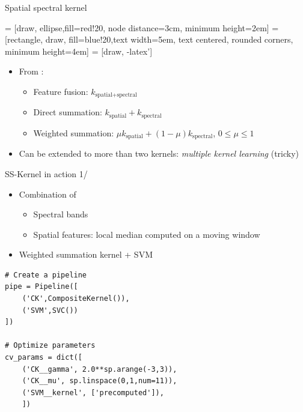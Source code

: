 \documentclass[10pt,aspectratio=1610]{beamer}
\begin{document}
\begin{frame}[label={sec:org58286c6}]{Spatial spectral kernel}
\begin{center}
   = [draw, ellipse,fill=red!20, node distance=3cm, minimum height=2em]
   = [rectangle, draw, fill=blue!20,text width=5em, text centered, rounded corners, minimum height=4em]
   = [draw, -latex']
\end{center}

\begin{itemize}
\item From \cite{1576697}:
\begin{itemize}
\item Feature fusion: \(k_{\text{spatial+spectral}}\)
\item Direct summation: \(k_{\text{spatial}} + k_{\text{spectral}}\)
\item Weighted summation: \(\mu k_{\text{spatial}} + (1-\mu)k_{\text{spectral}}\), \(0\leq \mu \leq 1\)
\end{itemize}
\item Can be extended to more than two kernels: \emph{multiple kernel learning} (tricky)
\end{itemize}
\end{frame}
\begin{frame}[fragile,label={sec:org9973fba}]{SS-Kernel in action 1/}
 \begin{itemize}
\item Combination of
\begin{itemize}
\item Spectral bands
\item Spatial features: local median computed on a moving window
\end{itemize}
\item Weighted summation kernel + SVM
\end{itemize}

\begin{verbatim}
# Create a pipeline
pipe = Pipeline([
    ('CK',CompositeKernel()),
    ('SVM',SVC())
])

# Optimize parameters
cv_params = dict([
    ('CK__gamma', 2.0**sp.arange(-3,3)),
    ('CK__mu', sp.linspace(0,1,num=11)),
    ('SVM__kernel', ['precomputed']),
    ])
\end{verbatim}
\end{frame}
\end{document}
